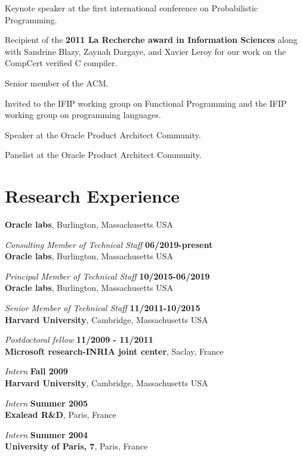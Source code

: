 \documentclass[margin,line]{res}
\begin{document}
\begin{resume}
Keynote speaker at the first international conference on Probabilistic Programming. 

Recipient of the {\bf 2011 La Recherche award in Information Sciences} along
with Sandrine Blazy, Zaynah Dargaye, and Xavier Leroy for our work on the
CompCert verified C compiler.

Senior member of the ACM.

Invited to the IFIP working group on Functional Programming and the
IFIP working group on programming languages.

Speaker at the Oracle Product Architect Community.

Panelist at the Oracle Product Architect Community.

\section{\sc Research Experience}

{\bf Oracle labs}, Burlington, Massachusetts USA
\vspace{-.4cm}

{\em Consulting Member of Technical Staff} \hfill {\bf 06/2019-present}\\
{\bf Oracle labs}, Burlington, Massachusetts USA
\vspace{-.4cm}

{\em Principal Member of Technical Staff} \hfill {\bf 10/2015-06/2019}\\
{\bf Oracle labs}, Burlington, Massachusetts USA
\vspace{-.4cm}

{\em Senior Member of Technical Staff} \hfill {\bf 11/2011-10/2015}\\
       {\bf Harvard University}, Cambridge, Massachusetts USA
\vspace{-.4cm}

{\em Postdoctoral fellow} \hfill {\bf 11/2009 - 11/2011}\\
{\bf Microsoft research-INRIA joint center}, Saclay, France
\vspace{-.4cm}

{\em Intern} \hfill {\bf Fall 2009}\\
{\bf Harvard University}, Cambridge, Massachusetts USA

\vspace{-.4cm}
{\em Intern} \hfill {\bf Summer 2005}\\
{\bf Exalead R\&D}, Paris, France

\vspace{-.4cm}
{\em Intern} \hfill {\bf Summer 2004}\\
{\bf University of Paris, 7}, Paris, France


\end{resume}
\end{document}
